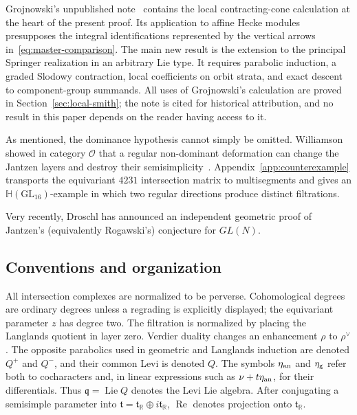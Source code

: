 \documentclass[11pt]{amsart}
\theoremstyle{definition}
\theoremstyle{remark}
\newcommand{\Hh}{\mathbb H}
\begin{document}
Grojnowski's unpublished note~\cite{GrojnowskiJantzen} contains the local
contracting-cone calculation at the heart of the present proof.  Its
application to affine Hecke modules presupposes the integral identifications
represented by the vertical arrows in~\eqref{eq:master-comparison}.  The main
new result is the extension to the principal Springer realization in an arbitrary 
Lie type.  It
requires parabolic induction, a graded Slodowy
contraction, local coefficients on orbit strata, and exact descent to
component-group summands.
All uses of Grojnowski's calculation are proved in
Section~\ref{sec:local-smith}; the note is
cited for historical attribution, and no result in this paper depends on the
reader having access to it.

\smallskip

As mentioned, the dominance hypothesis cannot simply be omitted.  Williamson showed in
category $\mathcal O$ that a regular non-dominant deformation can change the
Jantzen layers and destroy their
semisimplicity~\cite[Sections~1.6 and~8.4]{WilliamsonLocal}.
Appendix~\ref{app:counterexample} transports the equivariant $4231$
intersection matrix to multisegments and gives an $\Hh(\mathrm{GL}_{16})$-example in which two regular directions produce distinct
filtrations.

\smallskip

Very recently, Droschl \cite{Dro} has announced an independent geometric proof of Jantzen's (equivalently Rogawski's) conjecture for $GL(N)$.

\subsection*{Conventions and organization}

All intersection complexes are normalized to be perverse.  Cohomological
degrees are ordinary degrees unless a regrading is explicitly displayed; the
equivariant parameter $z$ has degree two.  The filtration is normalized by
placing the Langlands quotient in layer zero.  Verdier duality changes an
enhancement $\rho$ to $\rho^\vee$.  The opposite parabolics used in geometric
and Langlands induction are denoted $Q^+$ and $Q^-$, and their common Levi is
denoted $Q$.  The symbols $\eta_{\rm an}$ and $\eta_{\rm g}$ refer both to cocharacters and,
in linear expressions such as $\nu+t\eta_{\rm an}$, for their differentials.
Thus $\mathfrak q=\operatorname{Lie}Q$ denotes the Levi Lie algebra.  After conjugating a semisimple
parameter into
$\mathfrak t=\mathfrak t_{\mathbb R}\oplus i\mathfrak t_{\mathbb R}$,
$\operatorname{Re}$ denotes projection onto
$\mathfrak t_{\mathbb R}$.
\end{document}
